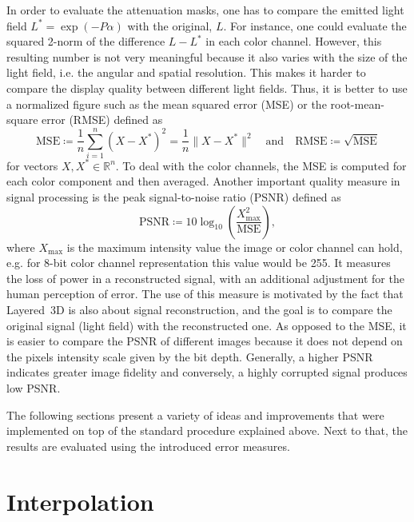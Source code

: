 In order to evaluate the attenuation masks, one has to compare the emitted light field $L^\ast = \exp(- P \alpha)$ with the original, $L$.
For instance, one could evaluate the squared 2-norm of the difference $L - L^\ast$ in each color channel.
However, this resulting number is not very meaningful because it also varies with the size of the light field, i.e. the angular and spatial resolution.
This makes it harder to compare the display quality between different light fields.
Thus, it is better to use a normalized figure such as the mean squared error \mbox{(MSE)} or the root-mean-square error \mbox{(RMSE)} defined as
\begin{equation*}
	\text{MSE} \coloneqq \frac{1}{n} \sum_{i = 1}^{n} (X - X^\ast)^2 = \frac{1}{n} \lVert X - X^\ast \rVert^2
	\quad \text{and} \quad
	\text{RMSE} \coloneqq \sqrt{\text{MSE}}
\end{equation*}
for vectors $X, X^\ast \in \mathbb{R}^n$.
To deal with the color channels, the \mbox{MSE} is computed for each color component and then averaged.
Another important quality measure in signal processing is the peak signal-to-noise ratio \mbox{(PSNR)} defined as
\begin{equation*}
	\text{PSNR} \coloneqq 10 \log_{10} \left(\frac{X_\text{max}^2}{\text{MSE}}\right),
\end{equation*}
where $X_\text{max}$ is the maximum intensity value the image or color channel can hold, e.g. for 8-bit color channel representation this value would be 255.
It measures the loss of power in a reconstructed signal, with an additional adjustment for the human perception of error.
The use of this measure is motivated by the fact that \mbox{Layered 3D} is also about signal reconstruction, and the goal is to compare the original signal (light field) with the reconstructed one. 
As opposed to the MSE, it is easier to compare the PSNR of different images because it does not depend on the pixels intensity scale given by the bit depth.
Generally, a higher \mbox{PSNR} indicates greater image fidelity and conversely, a highly corrupted signal produces low \mbox{PSNR}.

The following sections present a variety of ideas and improvements that were implemented on top of the standard procedure explained above.
Next to that, the results are evaluated using the introduced error measures.

\section{Interpolation}
\label{sec:interpolation}

